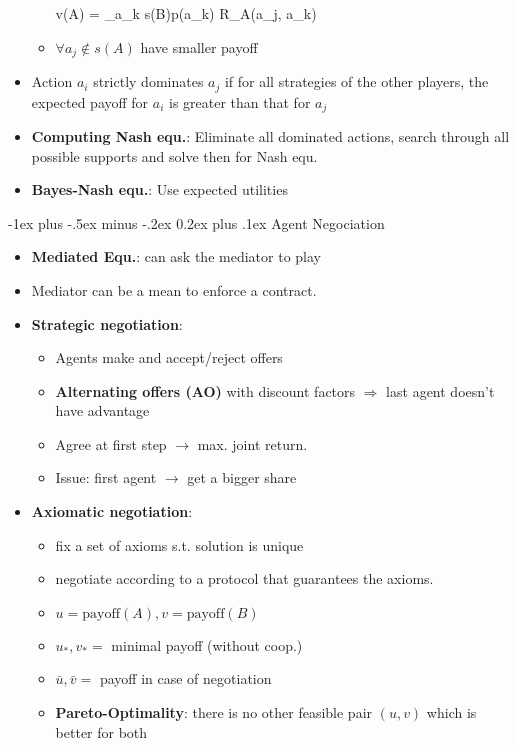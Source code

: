 \documentclass[10pt,a4paper,landscape]{article}
\makeatletter
\renewcommand{\section}{\@startsection{section}{1}{0mm}%
                                {-1ex plus -.5ex minus -.2ex}%
                                {0.2ex plus .1ex}%
                                {\normalfont\tiny\bfseries}}
\newenvironment{myalign*}{%
  \setlength{\abovedisplayskip}{2pt}%
  \setlength{\belowdisplayskip}{2pt}%
  \start@align\@ne\st@rredtrue\m@ne
}%
{\endalign}
\makeatother
\begin{document}
\begin{multicols*}{5}
\begin{itemize}
\begin{itemize}
		\begin{myalign*}
		    v(A) = \sum_{a_k \in s(B)}p(a_k) R_A(a_j, a_k) 
		\end{myalign*}
		\item $\forall a_j \not\in s(A)$ have smaller payoff
	\end{itemize}
	\item Action $a_i$ strictly dominates $a_j$ if for all strategies of the other players, the expected payoff for $a_i$ is greater than that for $a_j$
	\item \textbf{Computing Nash equ.}: Eliminate all dominated actions, search through all possible supports and solve then for Nash equ.
	\item \textbf{Bayes-Nash equ.}: Use expected utilities
	
\end{itemize}

\section{Agent Negociation}
\begin{itemize}
	\item \textbf{Mediated Equ.}: can ask the mediator to play 
	\item Mediator can be a mean to enforce a contract.

	\item \textbf{Strategic negotiation}:
	\begin{itemize}
	 	\item Agents make and accept/reject offers
	 	\item \textbf{Alternating offers (AO)} with discount factors
	 	$\Rightarrow$ last agent doesn't have advantage
	 	\item Agree at first step $\rightarrow$ max. joint return.
	 	\item Issue: first agent $\rightarrow$ get a bigger share
	 \end{itemize}

	\item \textbf{Axiomatic negotiation}:
	\begin{itemize}
		\item fix a set of axioms s.t. solution is unique
	 	\item negotiate according to a protocol that guarantees the axioms.
	 	\item $u = \text{payoff}(A), v = \text{payoff}(B)$
	 	\item $u_*, v_* =$ minimal payoff (without coop.)
	 	\item $\bar{u}, \bar{v} = $ payoff in case of negotiation
	 	\item \textbf{Pareto-Optimality}: there is no other feasible pair $(u, v)$ which is better for both
	\end{itemize} 
	

\end{itemize}
\end{multicols*}
\end{document}
